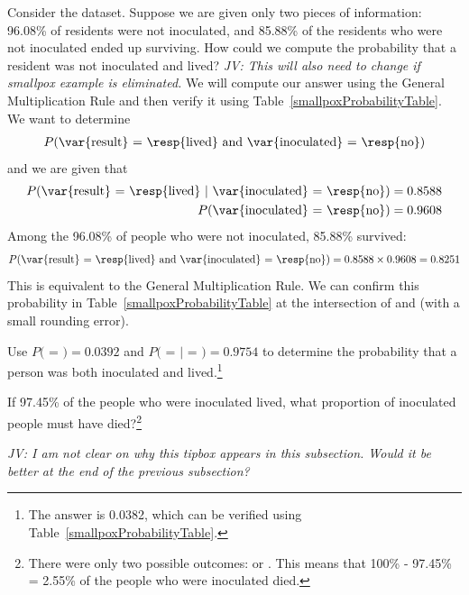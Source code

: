 \begin{doublespace}
\begin{example}{Consider the  dataset. Suppose we are given only two pieces of information: 96.08\% of residents were not inoculated, and 85.88\% of the residents who were not inoculated ended up surviving. How could we compute the probability that a resident was not inoculated and lived? \textit{JV: This will also need to change if smallpox example is eliminated.}}
We will compute our answer using the General Multiplication Rule and then verify it using Table~\ref{smallpoxProbabilityTable}. We want to determine
\begin{eqnarray*}
P(\text{\var{result} = \resp{lived} and \var{inoculated} = \resp{no}})
\end{eqnarray*}
and we are given that
\begin{eqnarray*}
P(\text{\var{result} = \resp{lived} }|\text{ \var{inoculated} = \resp{no}})=0.8588 \\
P(\text{\var{inoculated} = \resp{no}})=0.9608
\end{eqnarray*}
Among the 96.08\% of people who were not inoculated, 85.88\% survived:
\begin{eqnarray*}
P(\text{\var{result} = \resp{lived} and \var{inoculated} = \resp{no}}) = 0.8588\times 0.9608 = 0.8251
\end{eqnarray*}
This is equivalent to the General Multiplication Rule. We can confirm this probability in Table~\ref{smallpoxProbabilityTable} at the intersection of  and  (with a small rounding error).
\end{example}

\begin{exercise}
Use $P($ = $) = 0.0392$ and $P($ =  $|$  = $) = 0.9754$ to determine the probability that a person was both inoculated and lived.\footnote{The answer is 0.0382, which can be verified using Table~\ref{smallpoxProbabilityTable}.}
\end{exercise}

\begin{exercise}
If 97.45\% of the people who were inoculated lived, what proportion of inoculated people must have died?\footnote{There were only two possible outcomes:  or . This means that 100\% - 97.45\% = 2.55\% of the people who were inoculated died.}
\end{exercise}

\textit{JV: I am not clear on why this tipbox appears in this subsection. Would it be better at the end of the previous subsection?}


\end{doublespace}
